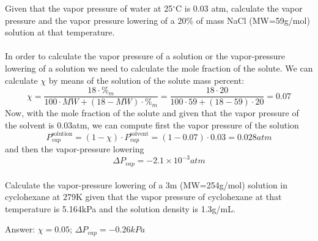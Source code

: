 \documentclass[main.tex]{subfiles}
\begin{document}
\begin{description}
\begin{example} %
Given that the vapor pressure of water at 25$^{\circ}$C  is 0.03 atm, calculate the vapor pressure and the vapor pressure lowering of a 20\% of mass NaCl (MW=59g/mol) solution at that temperature.
\\
 \\
In order to calculate the vapor pressure of a solution or the vapor-pressure lowering of a solution we need to calculate the mole fraction of the solute. We can calculate $\chi$ by means of the solution of the solute mass percent:
\[\chi=\frac{18\cdot  \%_{m}  }{100\cdot MW + (18-MW)\cdot \%_{m} }=\frac{18\cdot  20  }{100\cdot 59 + (18-59)\cdot 20 }=0.07\]
Now, with the mole fraction of the solute and given that the vapor pressure of the solvent is 0.03atm, we can compute first the vapor pressure of the solution
\[ P_{vap}^{\text{solution}}=(1-  \chi ) \cdot P_{vap}^{\text{solvent}}=(1-0.07)\cdot 0.03=0.028atm\]
and then the vapor-pressure lowering
\[\Delta P_{vap}=-2.1\times 10^{-3} atm\]
\faDiamond\ \\
Calculate the vapor-pressure lowering of a 3m  (MW=254g/mol) solution in cyclohexane at 279K given  that the vapor pressure of cyclohexane at that temperature is 5.164kPa and the solution density is 1.3g/mL.\\
\begin{flushright} Answer: $\chi=0.05$; $\Delta P_{vap}=-0.26kPa$\end{flushright}
\end{example}%




\end{description}
\end{document}
